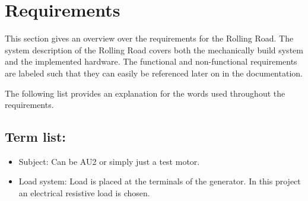 \chapter{Requirements}
This section gives an overview over the requirements for the Rolling Road. The system description of the Rolling Road covers both the mechanically build system and the implemented hardware. The functional and non-functional requirements are labeled such that they can easily be referenced later on in the documentation.

The following list provides an explanation for the words used throughout the requirements. 
\section{Term list:}
\begin{itemize}
	\item Subject: Can be AU2 or simply just a test motor.
	\item Load system: Load is placed at the terminals of the generator. In this project an electrical resistive load is chosen.
\end{itemize}


